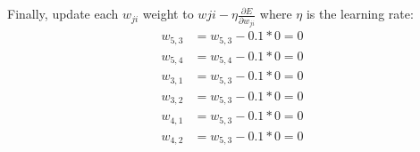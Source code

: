 \documentclass{article}
\begin{document}
\\
\\
Finally, update each $w_{ji}$ weight to $w{ji} - \eta \frac{\partial E}{\partial w_{ji}}$ where $\eta$ is the learning rate:
\begin{align*}
 w_{5,3} &= w_{5,3} - 0.1*0 = 0\\
 w_{5,4} &= w_{5,4} - 0.1*0 = 0\\
 w_{3,1} &= w_{5,3} - 0.1*0 = 0\\
 w_{3,2} &= w_{5,3} - 0.1*0 = 0\\
 w_{4,1} &= w_{5,3} - 0.1*0 = 0\\
 w_{4,2} &= w_{5,3} - 0.1*0 = 0\\
\end{align*}
\end{document}
